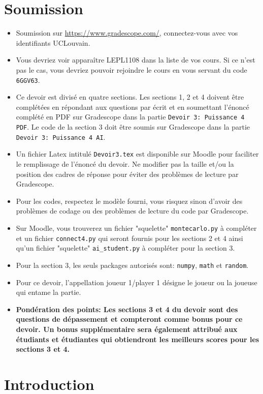 \documentclass[11pt,answers]{exam}
\begin{document}
\section*{Soumission}
\begin{itemize}
\setlength{\itemsep}{0mm}
	\item Soumission sur \url{https://www.gradescope.com/}, connectez-vous avec vos identifiants UCLouvain.
	\item Vous devriez voir apparaître LEPL1108 dans la liste de vos cours. Si ce n'est pas le cas, vous devriez pouvoir rejoindre le cours en vous servant du code \texttt{6GGV63}.
    \item Ce devoir est divisé en quatre sections. Les sections 1, 2 et 4 doivent être complétées en répondant aux questions par écrit et en soumettant l'énoncé complété en PDF sur Gradescope dans la partie \texttt{Devoir 3: Puissance 4 PDF}. Le code de la section 3 doit être soumis sur Gradescope dans la partie \texttt{Devoir 3: Puissance 4 AI}.
    \item Un fichier Latex intitulé \texttt{Devoir3.tex} est disponible sur Moodle pour faciliter le remplissage de l'énoncé du devoir. Ne modifier pas la taille et/ou la position des cadres de réponse pour éviter des problèmes de lecture par Gradescope.
	\item Pour les codes, respectez le modèle fourni, vous risquez sinon d’avoir des problèmes de codage ou des problèmes de lecture du code par Gradescope.
    \item Sur Moodle, vous trouverez un fichier "squelette" \texttt{montecarlo.py} à compléter et un fichier \texttt{connect4.py} qui seront fournis pour les sections 2 et 4 ainsi qu'un fichier "squelette" \texttt{ai\_student.py} à compléter pour la section 3.
	\item Pour la section 3, les seuls packages autorisés sont: \texttt{numpy}, \texttt{math} et \texttt{random}.
    \item Pour ce devoir, l'appellation joueur 1/player 1 désigne le joueur ou la joueuse qui entame la partie.
    \item \textbf{Pondération des points: Les sections 3 et 4 du devoir sont des questions de dépassement et compteront comme bonus pour ce devoir. Un bonus supplémentaire sera également attribué aux étudiants et étudiantes qui obtiendront les meilleurs scores pour les sections 3 et 4.}
\end{itemize}


\newpage

\section*{Introduction}
\end{document}
